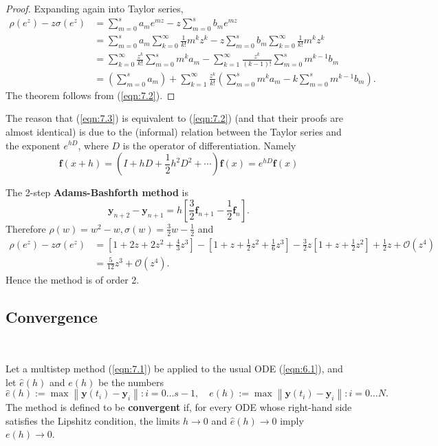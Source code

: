 \documentclass[a4paper]{article}
\begin{document}
\begin{proof}
    Expanding again into Taylor series,
\[
\begin{aligned}
\rho\left(e^z\right)-z \sigma\left(e^z\right) & =\sum_{m=0}^s a_m e^{m z}-z \sum_{m=0}^s b_m e^{m z}\\ 
&=\sum_{m=0}^s a_m \sum_{k=0}^{\infty} \frac{1}{k !} m^k z^k-z \sum_{m=0}^s b_m \sum_{k=0}^{\infty} \frac{1}{k !} m^k z^k \\
& =\sum_{k=0}^{\infty} \frac{z^k}{k !} \sum_{m=0}^s m^k a_m-\sum_{k=1}^{\infty} \frac{z^k}{(k-1) !} \sum_{m=0}^s m^{k-1} b_m \\
& =\left(\sum_{m=0}^s a_m\right)+\sum_{k=1}^{\infty} \frac{z^k}{k !}\left(\sum_{m=0}^s m^k a_m-k \sum_{m=0}^s m^{k-1} b_m\right) .
\end{aligned}
\]
The theorem follows from (\ref{eqn:7.2}).
\end{proof}
The reason that (\ref{eqn:7.3}) is equivalent to (\ref{eqn:7.2}) (and that their proofs are almost identical) is due to the (informal) relation between the Taylor series and the exponent $e^{h D}$, where $D$ is the operator of differentiation. Namely
\[
\mathbf{f}(x+h)=\left(I+h D+\frac{1}{2} h^2 D^2+\cdots\right) \mathbf{f}(x)=e^{h D} \mathbf{f}(x)
\]
\begin{example}
    The 2-step \textbf{Adams-Bashforth method} is
\begin{equation}\label{eqn:7.4}
    \mathbf{y}_{n+2}-\mathbf{y}_{n+1}=h\left[\frac{3}{2} \mathbf{f}_{n+1}-\frac{1}{2} \mathbf{f}_n\right] .
\end{equation}
Therefore $\rho(w)=w^2-w, \sigma(w)=\frac{3}{2} w-\frac{1}{2}$ and
\begin{align*}
    \rho\left(e^z\right)-z \sigma\left(e^z\right)&=\left[1+2 z+2 z^2+\frac{4}{3} z^3\right]-\left[1+z+\frac{1}{2} z^2+\frac{1}{6} z^3\right]-\frac{3}{2} z\left[1+z+\frac{1}{2} z^2\right]+\frac{1}{2} z+\mathcal{O}\left(z^4\right)\\ 
    &=\frac{5}{12} z^3+\mathcal{O}\left(z^4\right).
\end{align*}
Hence the method is of order 2.
\end{example}

\subsection{Convergence}
\ \vspace*{-1.5em}
\begin{definition}
    Let a multistep method (\ref{eqn:7.1}) be applied to the usual ODE (\ref{eqn:6.1}), and let $\widehat{e}(h)$ and $e(h)$ be the numbers
\[
\widehat{e}(h):=\max \left\|\mathbf{y}\left(t_i\right)-\mathbf{y}_i\right\|: i=0 \ldots s-1, \quad e(h):=\max \left\|\mathbf{y}\left(t_i\right)-\mathbf{y}_i\right\|: i=0 \ldots N .
\]
The method is defined to be \textbf{convergent} if, for every ODE whose right-hand side satisfies the Lipshitz condition, the limits $h \rightarrow 0$ and $\widehat{e}(h) \rightarrow 0$ imply $e(h) \rightarrow 0$.
\end{definition}
\end{document}

